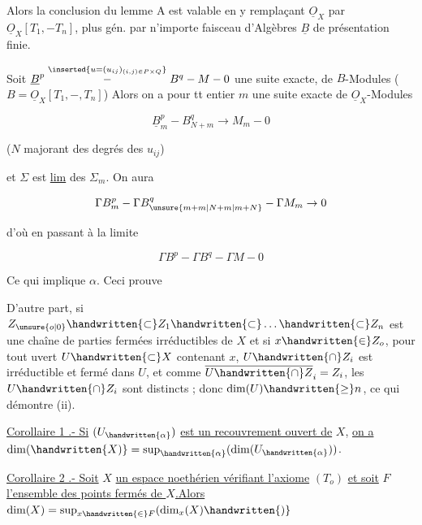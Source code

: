 
Alors la conclusion du lemme A est valable en y remplaçant $\underline O_X$ par $\underline O_X[T_1,-T_n]$, plus gén. par n'importe  faisceau d'Algèbres $\underline B$ de présentation finie.

Soit $\underline B^p\mathrel{\overset{\inserted{u=(u_{ij})_{(i,j)\in P\times Q}}}{-}}B^q-M-0$ une suite exacte, \inserted{$\Sigma$}  de $B$-Modules ($B=\underline O_X[T_1,-,T_n]$) Alors on a pour tt entier $m$ une suite exacte  de $\underline O_X$-Modules 

\[
 \underline B_m^p - B_{N+m}^q\to M_m-0
\]

($N$ majorant des degrés des $u_{ij}$)

 et $\Sigma$ est \uline{lim} des $\Sigma_m$. On aura

\[
 \Gamma B_m^p - \Gamma B_{\unsure{m+m|N+m|m+N}}^q - \Gamma M_m\to0
\]

d'où en passant à la limite

\[
 \Gamma B^p - \Gamma B^q - \Gamma M-0
\]

Ce qui implique $\alpha$.  Ceci prouve

D'autre part, si $Z_{\unsure{o|0}}\handwritten{\subset} Z_1\handwritten{\subset}\ldots\handwritten{\subset}Z_n$ est une chaîne de parties fermées irréductibles de $X$ et si $x\handwritten{\in}Z_o$, pour tout uvert $U\handwritten{\subset}X$ contenant $x$, $U\handwritten{\cap}Z_i$ est irréductible et fermé dans $U$, et comme $\overline{U\handwritten{\cap}Z}_i=Z_i$, les $U\handwritten{\cap}Z_i$ sont distincts ; donc $\dim(U)\handwritten{\geq}n$, ce qui démontre (ii).

\uline{Corollaire 1 .- Si} $(U_{\handwritten{\alpha}})$ \uline{est un recouvrement ouvert de} $X$, \uline{on a} $\dim(\handwritten{X)}=\sup_{\handwritten{\alpha}}(\dim(U_{\handwritten{\alpha}}))$.

\uline{Corollaire 2 .- Soit} $X$ \uline{un espace noethérien vérifiant l'axiome} $(T_o)$ \uline{et soit} $F$ \uline{l'ensemble des points fermés de $X$.Alors} $\dim(X)=\sup_{x\handwritten{\in}F}(\dim_x(X)\handwritten{)}$


